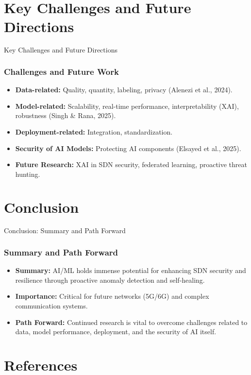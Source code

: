 \documentclass{beamer}
\begin{document}
\section{Key Challenges and Future Directions}

\begin{frame}{Key Challenges and Future Directions}
  \frametitle{Challenges and Future Work}
  \begin{itemize}
    \item \textbf{Data-related:} Quality, quantity, labeling, privacy (Alenezi et al., 2024).
    \item \textbf{Model-related:} Scalability, real-time performance, interpretability (XAI), robustness (Singh \& Rana, 2025).
    \item \textbf{Deployment-related:} Integration, standardization.
    \item \textbf{Security of AI Models:} Protecting AI components (Elsayed et al., 2025).
    \item \textbf{Future Research:} XAI in SDN security, federated learning, proactive threat hunting.
  \end{itemize}
\end{frame}

\section{Conclusion}

\begin{frame}{Conclusion: Summary and Path Forward}
  \frametitle{Summary and Path Forward}
  \begin{itemize}
    \item \textbf{Summary:} AI/ML holds immense potential for enhancing SDN security and resilience through proactive anomaly detection and self-healing.
    \item \textbf{Importance:} Critical for future networks (5G/6G) and complex communication systems.
    \item \textbf{Path Forward:} Continued research is vital to overcome challenges related to data, model performance, deployment, and the security of AI itself.
  \end{itemize}
\end{frame}

\section{References}
\end{document}
